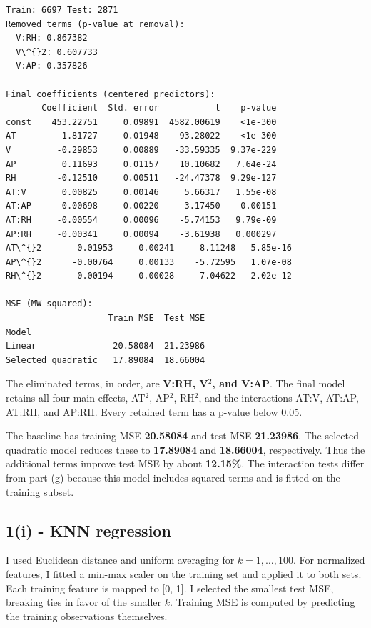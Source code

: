\documentclass[11pt]{article}
\begin{document}
    \begin{minipage}{\linewidth}
\begin{Verbatim}[commandchars=\\\{\}]
Train: 6697 Test: 2871
Removed terms (p-value at removal):
  V:RH: 0.867382
  V\^{}2: 0.607733
  V:AP: 0.357826

Final coefficients (centered predictors):
       Coefficient  Std. error           t    p-value
const    453.22751     0.09891  4582.00619    <1e-300
AT        -1.81727     0.01948   -93.28022    <1e-300
V         -0.29853     0.00889   -33.59335  9.37e-229
AP         0.11693     0.01157    10.10682   7.64e-24
RH        -0.12510     0.00511   -24.47378  9.29e-127
AT:V       0.00825     0.00146     5.66317   1.55e-08
AT:AP      0.00698     0.00220     3.17450    0.00151
AT:RH     -0.00554     0.00096    -5.74153   9.79e-09
AP:RH     -0.00341     0.00094    -3.61938   0.000297
AT\^{}2       0.01953     0.00241     8.11248   5.85e-16
AP\^{}2      -0.00764     0.00133    -5.72595   1.07e-08
RH\^{}2      -0.00194     0.00028    -7.04622   2.02e-12

MSE (MW squared):
                    Train MSE  Test MSE
Model
Linear               20.58084  21.23986
Selected quadratic   17.89084  18.66004
    \end{Verbatim}
\end{minipage}

    The eliminated terms, in order, are \textbf{V:RH, V\(^2\), and V:AP}.
The final model retains all four main effects, AT\(^2\), AP\(^2\),
RH\(^2\), and the interactions AT:V, AT:AP, AT:RH, and AP:RH. Every
retained term has a p-value below 0.05.

The baseline has training MSE \textbf{20.58084} and test MSE
\textbf{21.23986}. The selected quadratic model reduces these to
\textbf{17.89084} and \textbf{18.66004}, respectively. Thus the
additional terms improve test MSE by about \textbf{12.15\%}. The
interaction tests differ from part (g) because this model includes
squared terms and is fitted on the training subset.

    \hypertarget{i---knn-regression}{%
\subsection{1(i) - KNN regression}\label{i---knn-regression}}

I used Euclidean distance and uniform averaging for \(k=1,\ldots,100\).
For normalized features, I fitted a min-max scaler on the training set
and applied it to both sets. Each training feature is mapped to {[}0,
1{]}. I selected the smallest test MSE, breaking ties in favor of the
smaller \(k\). Training MSE is computed by predicting the training
observations themselves.
\end{document}
